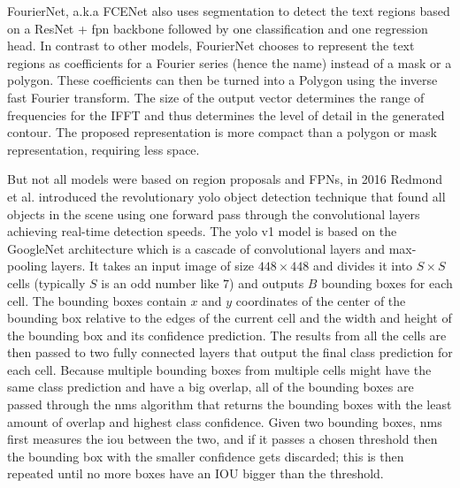 \label{fcenet}FourierNet, a.k.a FCENet \cite{riaz_fouriernet_2021} also uses segmentation to detect the text regions based on a ResNet \cite{he_deep_2016} + \gls{fpn} backbone followed by one classification and one regression head. In contrast to other models, FourierNet chooses to represent the text regions as coefficients for a Fourier series (hence the name) instead of a mask or a polygon. These coefficients can then be turned into a Polygon using the inverse fast Fourier transform. The size of the output vector determines the range of frequencies for the IFFT and thus determines the level of detail in the generated contour. The proposed representation is more compact than a polygon or mask representation, requiring less space.

But not all models were based on region proposals and FPNs, in 2016 Redmond et al. introduced the revolutionary \gls{yolo} object detection technique that found all objects in the scene using one forward pass through the convolutional layers achieving real-time detection speeds. The \gls{yolo} v1 model is based on the GoogleNet \cite{szegedy_going_2015} architecture which is a cascade of convolutional layers and max-pooling layers. It takes an input image of size $448\times448$ and divides it into $S\times S$ cells (typically $S$ is an odd number like $7$) and outputs $B$ bounding boxes for each cell. The bounding boxes contain $x$ and $y$ coordinates of the center of the bounding box relative to the edges of the current cell and the width and height of the bounding box and its confidence prediction. The results from all the cells are then passed to two fully connected layers that output the final class prediction for each cell. Because multiple bounding boxes from multiple cells might have the same class prediction and have a big overlap, all of the bounding boxes are passed through the \gls{nms} algorithm that returns the bounding boxes with the least amount of overlap and highest class confidence. Given two bounding boxes, \gls{nms} first measures the \gls{iou} between the two, and if it passes a chosen threshold then the bounding box with the smaller confidence gets discarded; this is then repeated until no more boxes have an IOU bigger than the threshold.

